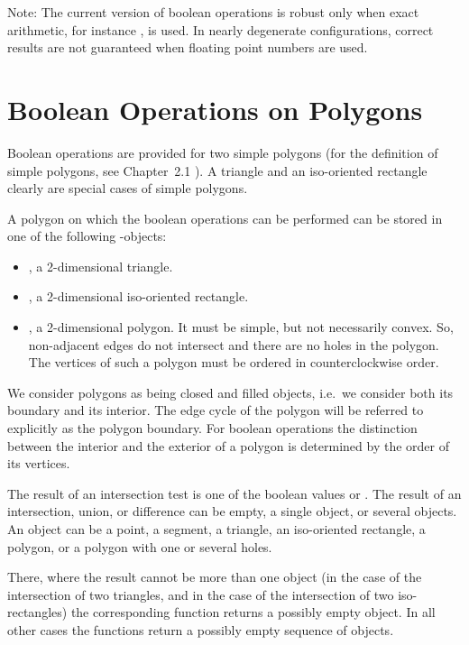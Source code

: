 Note:
The current version of boolean operations is robust only when exact arithmetic,
for instance , is used.
In nearly degenerate configurations, correct results are not guaranteed
when floating point numbers are used.


\newpage
\section{Boolean Operations on Polygons}

\ccDefinition
Boolean operations are provided for two simple polygons (for the
definition of simple polygons, see Chapter~2.1
).
A triangle and an iso-oriented rectangle clearly are special cases of 
simple polygons.

A polygon on which the boolean operations can be performed
can be stored in one of the following \cgal-objects:
\begin{itemize}
\item {}, a 2-dimensional triangle.
\item {}, a 2-dimensional iso-oriented rectangle.
\item {}, a 2-dimensional polygon. 
It must be simple, but not necessarily convex.
So, non-adjacent edges do not intersect and there are no holes in the polygon.
The vertices of such a polygon must be ordered in counterclockwise
order.
\end{itemize}

We consider polygons as being closed and filled objects, i.e.\ we consider
both its boundary and its interior. 
The edge cycle of the polygon will be referred
to explicitly as the polygon boundary.
For boolean operations the distinction between the interior and 
the exterior of a polygon is determined by the order of its vertices.

The result of an intersection test is one of the boolean
values  or .
The result of an intersection, union, or difference can be empty, a single
object, or several objects. 
An object can be a point, a segment, 
a triangle, an iso-oriented rectangle, a polygon, or a polygon with
one or several holes.

There, where the result cannot be more than one object (in the case of
the intersection of two triangles, and in the case of the 
intersection of two iso-rectangles) the corresponding function returns
a possibly empty object. In all other cases the functions return a
possibly empty sequence of objects. 

